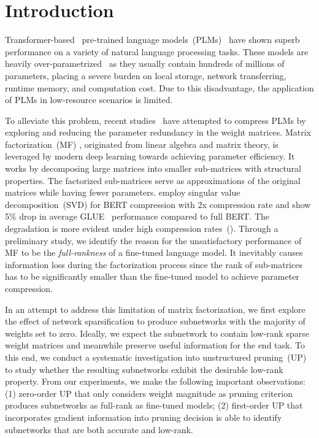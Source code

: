 \section{Introduction}

Transformer-based~\cite{transformer} pre-trained language models~(PLMs)~\cite{bert,roberta} have shown superb performance on a variety of natural language processing tasks. These models are heavily over-parametrized~\cite{overpara} as they usually contain hundreds of millions of parameters, placing a severe burden on local storage, network transferring, runtime memory, and computation cost. Due to this disadvantage, the application of PLMs in low-resource scenarios is limited.

To alleviate this problem, recent studies~\cite{l0,svd} have attempted to compress 
PLMs by exploring and reducing the parameter redundancy in the weight matrices. Matrix factorization~(MF) , originated from linear algebra and matrix theory, is leveraged by modern deep learning towards achieving parameter efficiency. It works by decomposing large matrices into smaller sub-matrices with structural properties. The factorized sub-matrices serve as approximations of the original matrices while having fewer parameters.  \citet{svd} employ singular value decomposition~(SVD) for BERT compression with 2x compression rate and show 5\% drop in average GLUE~\cite{glue} performance compared to full BERT. The degradation is more evident under high compression rates~(). Through a preliminary study, we identify the reason for the unsatisfactory performance of MF to be the \textit{full-rankness} of a fine-tuned language model. It inevitably causes information loss during the factorization process since the rank of sub-matrices has to be significantly smaller than the fine-tuned model to achieve parameter compression.


In an attempt to address this limitation of matrix factorization, we first explore the effect of network sparsification to produce subnetworks with the majority of weights set to zero. Ideally, we expect the subnetwork to contain low-rank sparse weight matrices and meanwhile preserve useful information for the end task. 
To this end, we conduct a systematic investigation into unstructured pruning~(UP) to study whether the resulting subnetworks exhibit the desirable low-rank property. From our experiments, we make the following important observations: (1) zero-order UP that only considers weight magnitude as pruning criterion produces subnetworks as full-rank as fine-tuned models; (2) first-order UP that incorporates gradient information into pruning decision is able to identify subnetworks that are both accurate and low-rank.

